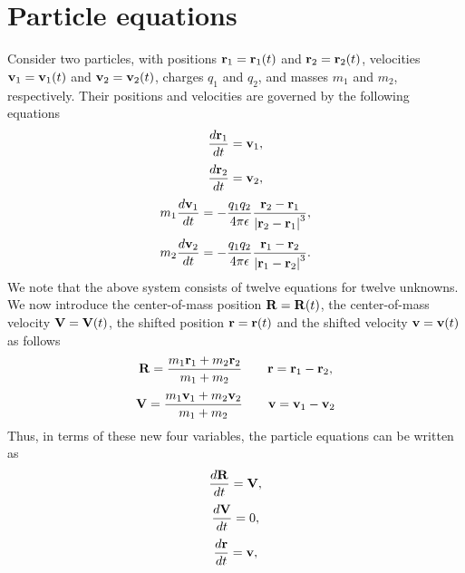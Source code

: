 \documentclass[a4paper,11pt]{report}
\begin{document}
\section{Particle equations}
\label{sec:coulomb_particle_equations}
Consider two particles, with positions $\mathbf{r}_1=\mathbf{r}_1(t)$ and $\mathbf{r}_2=\mathbf{r}_2(t)$, velocities $\mathbf{v}_1=\mathbf{v}_1(t)$ and $\mathbf{v}_2=\mathbf{v}_2(t)$, charges $q_1$ and $q_2$, and masses $m_1$ and $m_2$, respectively. Their positions and velocities are governed by the following equations 
\begin{equation}
    \label{eq:coul_particle_1_pos}
    \frac{d \mathbf{r}_1}{dt} = \mathbf{v}_1,
\end{equation}
\begin{equation}
    \label{eq:coul_particle_2_pos}
    \frac{d \mathbf{r}_2}{dt} = \mathbf{v}_2,
\end{equation}
\begin{equation}
    \label{eq:coul_particle_1_vel}
    m_1 \frac{d\mathbf{v}_1}{dt} = -\frac{q_1 q_2}{4 \pi \epsilon} \frac{\mathbf{r}_2 - \mathbf{r}_1}{\left | \mathbf{r}_2 - \mathbf{r}_1 \right |^3},
\end{equation}
\begin{equation}
    \label{eq:coul_particle_2_vel}
    m_2 \frac{d\mathbf{v}_2}{dt} = -\frac{q_1 q_2}{4 \pi \epsilon} \frac{\mathbf{r}_1 - \mathbf{r}_2}{\left | \mathbf{r}_1 - \mathbf{r}_2 \right |^3}.
\end{equation}
We note that the above system consists of twelve equations for twelve unknowns. We now introduce the center-of-mass position $\mathbf{R} = \mathbf{R}(t)$, the center-of-mass velocity $\mathbf{V} = \mathbf{V}(t)$, the shifted position $\mathbf{r} = \mathbf{r}(t)$ and the shifted velocity $\mathbf{v} = \mathbf{v}(t)$ as follows
\begin{equation*}
    \mathbf{R} = \frac{m_1 \mathbf{r}_1 + m_2 \mathbf{r}_2}{m_1 + m_2} \qquad \mathbf{r} = \mathbf{r}_1 - \mathbf{r}_2,
\end{equation*}
\begin{equation*}
    \mathbf{V} = \frac{m_1 \mathbf{v}_1 + m_2 \mathbf{v}_2}{m_1 + m_2} \qquad \mathbf{v} = \mathbf{v}_1 - \mathbf{v}_2
\end{equation*}
Thus, in terms of these new four variables, the particle equations can be written as
\begin{equation}
    \frac{d \mathbf{R}}{dt} = \mathbf{V},
\end{equation}
\begin{equation}
    \frac{d \mathbf{V}}{dt} = 0 ,
\end{equation}
\begin{equation}
    \label{eq:particle_pos}
    \frac{d \mathbf{r}}{dt} = \mathbf{v},
\end{equation}
\end{document}
